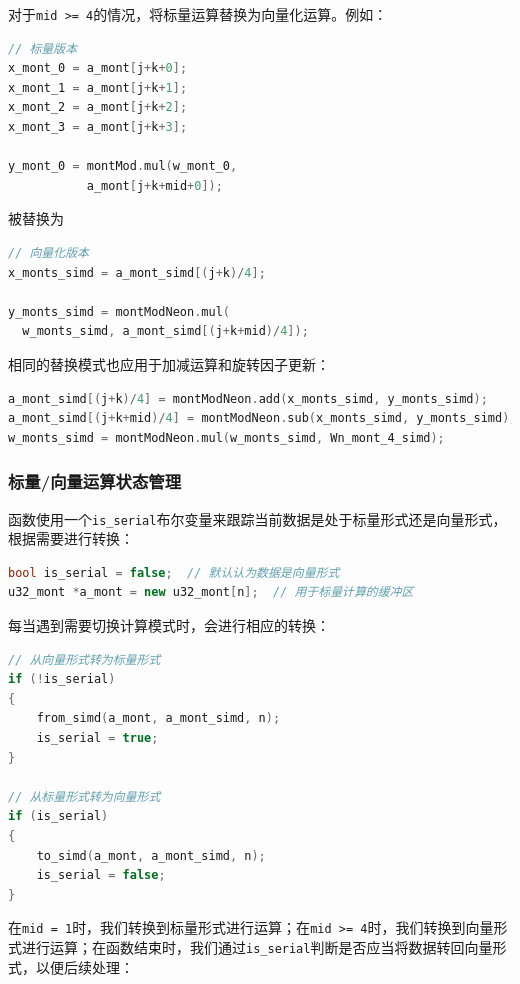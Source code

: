 \documentclass[a4paper]{article}
\begin{document}
对于\texttt{mid >= 4}的情况，将标量运算替换为向量化运算。例如：

\begin{lstlisting}[language=C++]
// 标量版本
x_mont_0 = a_mont[j+k+0];
x_mont_1 = a_mont[j+k+1];
x_mont_2 = a_mont[j+k+2];
x_mont_3 = a_mont[j+k+3];

y_mont_0 = montMod.mul(w_mont_0,
           a_mont[j+k+mid+0]);
\end{lstlisting}

被替换为

\begin{lstlisting}[language=C++]
// 向量化版本
x_monts_simd = a_mont_simd[(j+k)/4];

y_monts_simd = montModNeon.mul(
  w_monts_simd, a_mont_simd[(j+k+mid)/4]);
\end{lstlisting}

相同的替换模式也应用于加减运算和旋转因子更新：

\begin{lstlisting}[language=C++]
a_mont_simd[(j+k)/4] = montModNeon.add(x_monts_simd, y_monts_simd);
a_mont_simd[(j+k+mid)/4] = montModNeon.sub(x_monts_simd, y_monts_simd);
w_monts_simd = montModNeon.mul(w_monts_simd, Wn_mont_4_simd);
\end{lstlisting}

\subsubsection{标量/向量运算状态管理}

函数使用一个\texttt{is\_serial}布尔变量来跟踪当前数据是处于标量形式还是向量形式，根据需要进行转换：

\begin{lstlisting}[language=C++]
bool is_serial = false;  // 默认认为数据是向量形式
u32_mont *a_mont = new u32_mont[n];  // 用于标量计算的缓冲区
\end{lstlisting}

每当遇到需要切换计算模式时，会进行相应的转换：

\begin{lstlisting}[language=C++]
// 从向量形式转为标量形式
if (!is_serial)
{
    from_simd(a_mont, a_mont_simd, n);
    is_serial = true;
}

// 从标量形式转为向量形式
if (is_serial)
{
    to_simd(a_mont, a_mont_simd, n);
    is_serial = false;
}
\end{lstlisting}

在\texttt{mid = 1}时，我们转换到标量形式进行运算；在\texttt{mid >= 4}时，我们转换到向量形式进行运算；在函数结束时，我们通过\texttt{is\_serial}判断是否应当将数据转回向量形式，以便后续处理：
\end{document}
